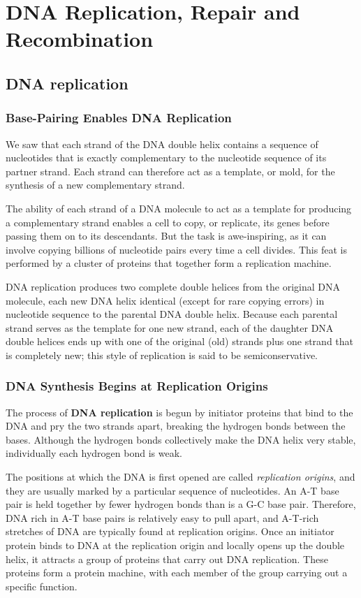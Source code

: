\chapter{DNA Replication, Repair and Recombination}

\section{DNA replication}

\subsection{Base-Pairing Enables DNA Replication}

We saw that each strand of the DNA double
helix contains a sequence of nucleotides that is exactly complementary to
the nucleotide sequence of its partner strand. Each strand can therefore
act as a template, or mold, for the synthesis of a new complementary
strand.

The ability of each strand of a DNA molecule to act as a template for
producing a complementary strand enables a cell to copy, or replicate,
its genes before passing them on to its descendants. But the task is awe-inspiring,
as it can involve copying billions of nucleotide pairs every time
a cell divides. This feat is performed by a cluster of proteins that together form
a replication machine.

DNA replication produces two complete double helices from the original
DNA molecule, each new DNA helix identical (except for rare copying
errors) in nucleotide sequence to the parental DNA double helix.
Because each parental strand serves as the template for one
new strand, each of the daughter DNA double helices ends up with one
of the original (old) strands plus one strand that is completely new; this
style of replication is said to be semiconservative.

\subsection{DNA Synthesis Begins at Replication Origins}

The process of \textbf{DNA replication} is begun by initiator proteins that bind
to the DNA and pry the two strands apart, breaking the hydrogen bonds
between the bases. Although the hydrogen bonds collectively
make the DNA helix very stable, individually each hydrogen bond is weak.

The positions at which the DNA is first opened are called \textit{replication
origins}, and they are usually marked by a particular sequence of nucleotides.
An A-T base pair is held together by fewer hydrogen bonds than is a G-C base
pair. Therefore, DNA rich in A-T base pairs is relatively easy to pull apart,
and A-T-rich stretches of DNA are typically found at replication origins.
Once an initiator protein binds to DNA at the replication origin and
locally opens up the double helix, it attracts a group of proteins that carry
out DNA replication. These proteins form a protein machine, with each
member of the group carrying out a specific function.

